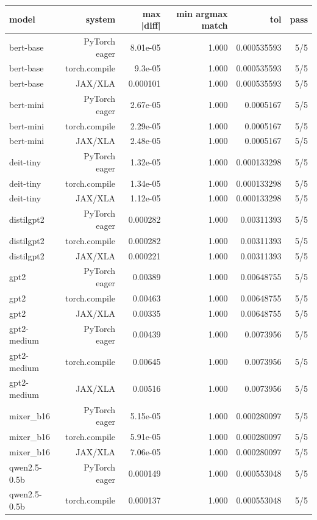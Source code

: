 \begin{tabular}{lrrrrr}
\toprule
model & system & max |diff| & min argmax match & tol & pass \\
\midrule
bert-base & PyTorch eager & 8.01e-05 & 1.000 & 0.000535593 & 5/5 \\
bert-base & torch.compile & 9.3e-05 & 1.000 & 0.000535593 & 5/5 \\
bert-base & JAX/XLA & 0.000101 & 1.000 & 0.000535593 & 5/5 \\
bert-mini & PyTorch eager & 2.67e-05 & 1.000 & 0.0005167 & 5/5 \\
bert-mini & torch.compile & 2.29e-05 & 1.000 & 0.0005167 & 5/5 \\
bert-mini & JAX/XLA & 2.48e-05 & 1.000 & 0.0005167 & 5/5 \\
deit-tiny & PyTorch eager & 1.32e-05 & 1.000 & 0.000133298 & 5/5 \\
deit-tiny & torch.compile & 1.34e-05 & 1.000 & 0.000133298 & 5/5 \\
deit-tiny & JAX/XLA & 1.12e-05 & 1.000 & 0.000133298 & 5/5 \\
distilgpt2 & PyTorch eager & 0.000282 & 1.000 & 0.00311393 & 5/5 \\
distilgpt2 & torch.compile & 0.000282 & 1.000 & 0.00311393 & 5/5 \\
distilgpt2 & JAX/XLA & 0.000221 & 1.000 & 0.00311393 & 5/5 \\
gpt2 & PyTorch eager & 0.00389 & 1.000 & 0.00648755 & 5/5 \\
gpt2 & torch.compile & 0.00463 & 1.000 & 0.00648755 & 5/5 \\
gpt2 & JAX/XLA & 0.00335 & 1.000 & 0.00648755 & 5/5 \\
gpt2-medium & PyTorch eager & 0.00439 & 1.000 & 0.0073956 & 5/5 \\
gpt2-medium & torch.compile & 0.00645 & 1.000 & 0.0073956 & 5/5 \\
gpt2-medium & JAX/XLA & 0.00516 & 1.000 & 0.0073956 & 5/5 \\
mixer\_b16 & PyTorch eager & 5.15e-05 & 1.000 & 0.000280097 & 5/5 \\
mixer\_b16 & torch.compile & 5.91e-05 & 1.000 & 0.000280097 & 5/5 \\
mixer\_b16 & JAX/XLA & 7.06e-05 & 1.000 & 0.000280097 & 5/5 \\
qwen2.5-0.5b & PyTorch eager & 0.000149 & 1.000 & 0.000553048 & 5/5 \\
qwen2.5-0.5b & torch.compile & 0.000137 & 1.000 & 0.000553048 & 5/5 \\

\end{tabular}
